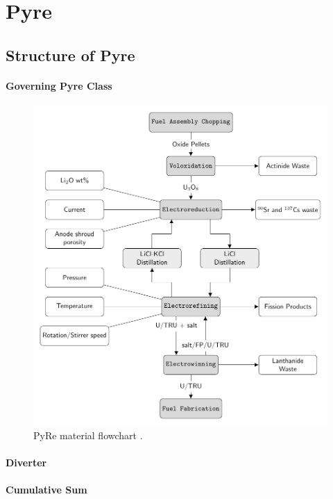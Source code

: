 \section{Pyre}

\subsection{Structure of Pyre}
\paragraph{Governing Pyre Class}

\begin{figure}
	\centering
	\includegraphics[width=0.95\linewidth]{images/flowchart}
	\caption{PyRe material flowchart \cite{borrelli_approaches_2017}.}
	\label{fig:flowchart}
\end{figure}

\paragraph{Diverter}

\paragraph{Cumulative Sum}


